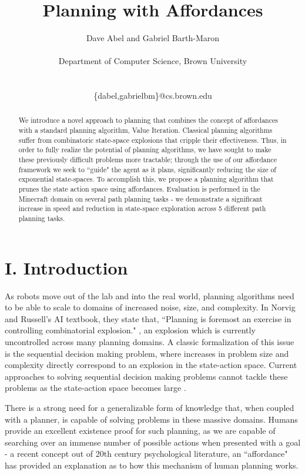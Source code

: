 \documentclass[a4paper]{article}
\title{Planning with Affordances}
\author{Dave Abel and Gabriel Barth-Maron \\ \\ Department of Computer Science, Brown University \\ \\ \begin{courier}\{dabel,gabrielbm\}@cs.brown.edu\end{courier}}
\date{}
\begin{document}
\maketitle

\begin{abstract}
We introduce a novel approach to planning that combines the concept of affordances \cite{Gibson} with a standard planning algorithm, Value Iteration. Classical planning algorithms suffer from combinatoric state-space explosions \cite{Norvig} that cripple their effectiveness. Thus, in order to fully realize the potential of planning algorithms, we have sought to make these previously difficult problems more tractable; through the use of our affordance framework we seek to ``guide" the agent as it plans, significantly reducing the size of exponential state-spaces. To accomplish this, we propose a planning algorithm that prunes the state action space using affordances. Evaluation is performed in the Minecraft domain on several path planning tasks - we demonstrate a significant increase in speed and reduction in state-space exploration across 5 different path planning tasks.
\end{abstract}

\section{I. Introduction}
As robots move out of the lab and into the real world, planning algorithms need to be able to scale to domains of increased noise, size, and complexity. In Norvig and Russell's AI textbook, they state that, ``Planning is foremost an exercise in controlling combinatorial explosion." \cite{Norvig}, an explosion which is currently uncontrolled across many planning domains. A classic formalization of this issue is the sequential decision making problem, where increases in problem size and complexity directly correspond to an explosion in the state-action space. Current approaches to solving sequential decision making problems cannot tackle these problems as the state-action space becomes large \cite{Grounds2005}. 

There is a strong need for a generalizable form of knowledge that, when coupled with a planner, is capable of solving problems in these massive domains. Humans provide an excellent existence proof for such planning, as we are capable of searching over an immense number of possible actions when presented with a goal - a recent concept out of 20th century psychological literature, an ``affordance" has provided an explanation as to how this mechanism of human planning works.
\end{document}
